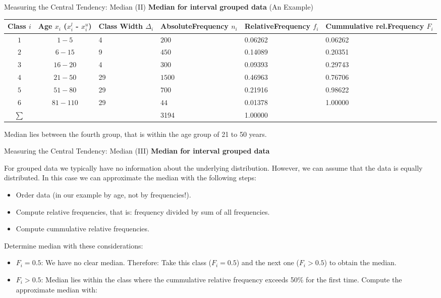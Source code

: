 \begin{frame}{Measuring the Central Tendency: Median (II)}
  \textbf{Median for interval grouped data} (An Example)
  \begin{table}
    \begin{tabularx}{\textwidth}{|c|c|p{4.5em}|X|X|X|}
      \rowcolor{faugray!62}\textbf{Class $i$} & \textbf{Age $x_i$} ($x_i^l$ - $x_i^u$) & \textbf{Class Width $\Delta_i$} & \textbf{Absolute\newline Frequency $n_i$} & \textbf{Relative\newline Frequency $f_i$} & \textbf{Cummulative rel.\newline Frequency $F_i$}\\ \hline
      $1$ & $1-5$ & 4 & $200$ &  0.06262  & 0.06262\\
      $2$ & $6-15$ & 9  & $450$ & 0.14089 & 0.20351\\
      $3$ & $16-20$ & 4 & $300$ & 0.09393 & 0.29743\\
      \rowcolor{fauyellow!62} $4$ & $21-50$ & 29 & $1500$ & 0.46963 & 0.76706\\
      $5$ & $51-80$ &  29 & $700$ &  0.21916 & 0.98622\\
      $6$ & $81-110$ & 29 & $44$ & 0.01378	& 1.00000 \\ \hline
      $\sum$ & & & 3194 & 1.00000 & \\ \hline
    \end{tabularx}
  \end{table}

  Median lies between the fourth group, that is within the age group of 21 to 50 years.
\end{frame}

\begin{frame}{Measuring the Central Tendency: Median (III)}
  \textbf{Median for interval grouped data}

  For grouped data we typically have no information about the underlying
  distribution. However, we can assume that the data is equally
  distributed. In this case we can approximate the median with the following
  steps:
  \begin{itemize}[noitemsep]
  \item Order data (in our example by age, not by frequencies!).
  \item Compute relative frequencies, that is: frequency divided by sum of all frequencies.
  \item Compute cummulative relative frequencies.
  \end{itemize}

  Determine median with these considerations:
  \begin{itemize}
  \item $F_i=0.5$: We have no clear median. Therefore: Take this class ($F_i=0.5$) and the next one ($F_i > 0.5$) to obtain the median.
  \item $F_i>0.5$: Median lies within the class where the cummulative
    relative frequency exceeds 50\% for the first time. Compute the approximate median with:
  \end{itemize}
\end{frame}

